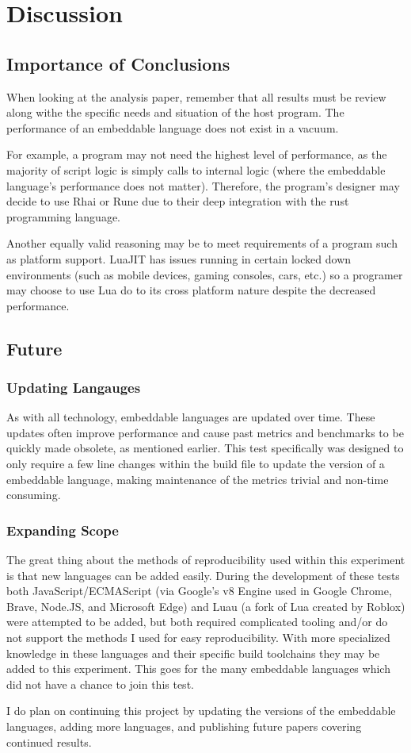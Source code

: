 \section{Discussion} \label{sec:discussion}

\subsection{Importance of Conclusions}
When looking at the analysis paper, remember that all results must be review along withe the specific needs and situation of the host program. The performance of an embeddable language does not exist in a vacuum.

For example, a program may not need the highest level of performance, as the majority of script logic is simply calls to internal logic (where the embeddable language's performance does not matter). Therefore, the program's designer may decide to use Rhai or Rune due to their deep integration with the rust programming language.

Another equally valid reasoning may be to meet requirements of a program such as platform support. LuaJIT has issues running in certain locked down environments\cite{luajit:consoles} (such as mobile devices, gaming consoles, cars, etc.) so a programer may choose to use Lua do to its cross platform nature despite the decreased performance.

\subsection{Future}

\subsubsection{Updating Langauges}
As with all technology, embeddable languages are updated over time. These updates often improve performance and cause past metrics and benchmarks to be quickly made obsolete, as mentioned earlier. This test specifically was designed to only require a few line changes within the build file to update the version of a embeddable language, making maintenance of the metrics trivial and non-time consuming.

\subsubsection{Expanding Scope}
The great thing about the methods of reproducibility used within this experiment is that new languages can be added easily. During the development of these tests both JavaScript/ECMAScript (via Google's v8 Engine\cite{v8} used in Google Chrome, Brave, Node.JS, and Microsoft Edge) and Luau (a fork of Lua created by Roblox\cite{luau}) were attempted to be added, but both required complicated tooling and/or do not support the methods I used for easy reproducibility. With more specialized knowledge in these languages and their specific build toolchains they may be added to this experiment. This goes for the many embeddable languages which did not have a chance to join this test.

I do plan on continuing this project by updating the versions of the embeddable languages, adding more languages, and publishing future papers covering continued results.
